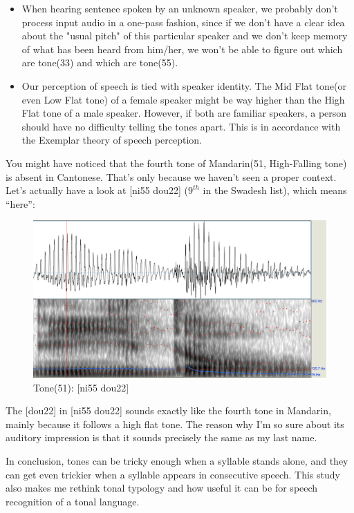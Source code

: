 \documentclass[a4paper]{article}
\begin{document}
\begin{itemize}
    \item When hearing sentence spoken by an unknown speaker, we probably don't process input audio in a one-pass fashion, since if we don't have a clear idea about the "usual pitch" of this particular speaker and we don't keep memory of what has been heard from him/her, we won't be able to figure out which are tone(33) and which are tone(55). 
    \item Our perception of speech is tied with speaker identity. The Mid Flat tone(or even Low Flat tone) of a female speaker might be way higher than the High Flat tone of a male speaker. However, if both are familiar speakers, a person should have no difficulty telling the tones apart. This is in accordance with the Exemplar theory of speech perception. 
\end{itemize}

You might have noticed that the fourth tone of Mandarin(51, High-Falling tone) is absent in Cantonese. That's only because we haven't seen a proper context. Let's actually have a look at [ni55 dou22] ($9^{th}$ in the Swadesh list), which means ``here'':

\begin{figure}[H]
    \centering
    \includegraphics[scale=0.25]{imgs/nidou.png}
    \caption{Tone(51): [ni55 dou22]}
\end{figure}

The [dou22] in [ni55 dou22] sounds exactly like the fourth tone in Mandarin, mainly because it follows a high flat tone. The reason why I'm so sure about its auditory impression is that it sounds precisely the same as my last name. 

In conclusion, tones can be tricky enough when a syllable stands alone, and they can get even trickier when a syllable appears in consecutive speech. This study also makes me rethink tonal typology and how useful it can be for speech recognition of a tonal language. 
\end{document}
